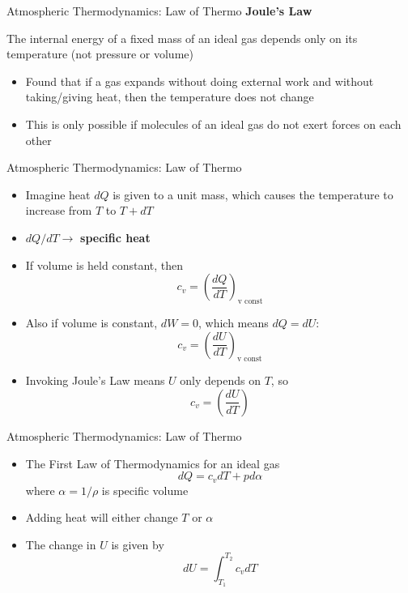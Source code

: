 \begin{frame}{Atmospheric Thermodynamics:  Law of Thermo}
\textbf{Joule's Law}
\begin{fancydefs}
	The internal energy of a fixed mass of an ideal gas depends only on its temperature (not pressure or volume)
\end{fancydefs}
\begin{itemize}
	\item Found that if a gas expands without doing external work and without taking/giving heat, then the temperature does not change
	\item This is only possible if molecules of an ideal gas do not exert forces on each other
\end{itemize}
\end{frame}
\begin{frame}{Atmospheric Thermodynamics:  Law of Thermo}
\begin{itemize}
	\item Imagine heat $dQ$ is given to a unit mass, which causes the temperature to increase from $T$ to $T+dT$
	\item $dQ/dT \rightarrow$ \textbf{specific heat}
	\item If volume is held constant, then
	$$c_v = \left(\frac{dQ}{dT}\right)_{\text{v const}}$$
	\item Also if volume is constant, $dW=0$, which means $dQ=dU$:
	$$c_v = \left(\frac{dU}{dT}\right)_{\text{v const}}$$
	\item Invoking Joule's Law means $U$ only depends on $T$, so
	$$c_v = \left(\frac{dU}{dT}\right)$$
\end{itemize}
\end{frame}
\begin{frame}{Atmospheric Thermodynamics:  Law of Thermo}
\begin{itemize}
	\item The First Law of Thermodynamics for an ideal gas
	$$dQ = c_vdT + pd\alpha$$
	where $\alpha = 1/\rho$ is specific volume
	\item Adding heat will either change $T$ or $\alpha$
	\item The change in $U$ is given by
	$$dU = \int^{T_2}_{T_1} c_v dT$$
\end{itemize}
\end{frame}
